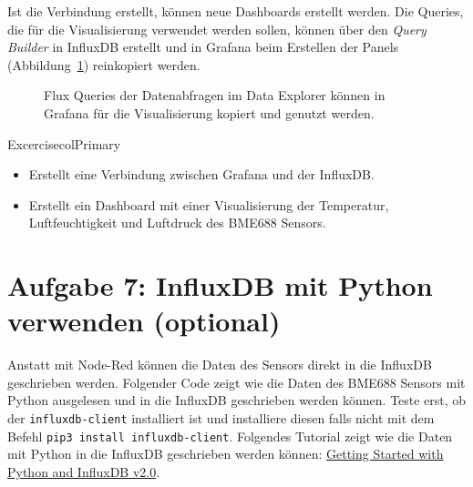 \documentclass[
  11pt,
  a4paper,
  oneside, openany  ,captions=tableheading
]{scrbook}
\providecommand{\tightlist}{%
  \setlength{\itemsep}{0pt}\setlength{\parskip}{0pt}}
\theoremstyle{remark}
\renewcommand{\markright}[1]{\def\chaptertitle{#1}} %
\begin{document}
Ist die Verbindung erstellt, können neue Dashboards erstellt werden. Die
Queries, die für die Visualisierung verwendet werden sollen, können über
den \emph{Query Builder} in InfluxDB erstellt und in Grafana beim
Erstellen der Panels (Abbildung~\ref{fig-grafanainfluxdbquery})
reinkopiert werden.

\begin{figure}


\caption{\label{fig-grafanainfluxdbquery}Flux Queries der Datenabfragen
im Data Explorer können in Grafana für die Visualisierung kopiert und
genutzt werden.}

\end{figure}%

\begin{boxtitle}{Excercise}{colPrimary}

\begin{itemize}
\tightlist
\item
  Erstellt eine Verbindung zwischen Grafana und der InfluxDB.
\item
  Erstellt ein Dashboard mit einer Visualisierung der Temperatur,
  Luftfeuchtigkeit und Luftdruck des BME688 Sensors.
\end{itemize}

\end{boxtitle}

\section*{Aufgabe 7: InfluxDB mit Python verwenden
(optional)}\label{aufgabe-7-influxdb-mit-python-verwenden-optional}

\markright{Aufgabe 7: InfluxDB mit Python verwenden (optional)}

Anstatt mit Node-Red können die Daten des Sensors direkt in die InfluxDB
geschrieben werden. Folgender Code zeigt wie die Daten des BME688
Sensors mit Python ausgelesen und in die InfluxDB geschrieben werden
können. Teste erst, ob der \texttt{influxdb-client} installiert ist und
installiere diesen falls nicht mit dem Befehl
\texttt{pip3\ install\ influxdb-client}. Folgendes Tutorial zeigt wie
die Daten mit Python in die InfluxDB geschrieben werden können:
\href{https://www.influxdata.com/blog/getting-started-with-python-and-influxdb-v2-0/}{Getting
Started with Python and InfluxDB v2.0}.
\end{document}
